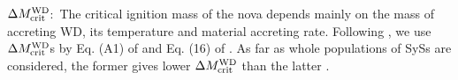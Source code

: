 \documentclass{elsart}
\begin{document}

$\Delta M_{\rm crit}^{\rm WD}$:\ The critical ignition mass of the
nova depends mainly on the mass of accreting WD, its temperature and
material accreting rate. Following \cite{lu06}, we use $\Delta
M_{\rm crit}^{\rm WD}$s by Eq. (A1) of \citet{n04} and Eq. (16) of
\cite{yun95}. As far as whole populations of SySs are considered,
the former gives lower $\Delta M_{\rm crit}^{\rm WD}$ than the
latter \citep{lu06}.

\end{document}
